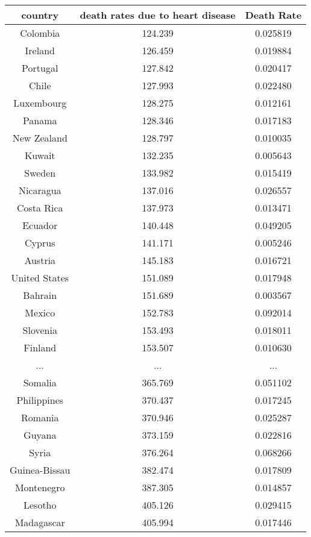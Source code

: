 \documentclass[a4 paper]{article}
\newcommand{\0}{\mathbf{0}}
\begin{document}
\begin{itemize}
\begin{table}[!ht]
\begin{tabular}{|c|c|c|}
        country & death rates due to heart disease & Death Rate\\\hline
        Colombia & 124.239 &    0.025819\\\hline
        Ireland & 126.459 &    0.019884\\\hline
        Portugal & 127.842 &    0.020417\\\hline
        Chile & 127.993 &    0.022480\\\hline
        Luxembourg & 128.275 &    0.012161\\\hline
        Panama & 128.346 &    0.017183\\\hline
        New Zealand & 128.797 &    0.010035\\\hline
        Kuwait & 132.235 &    0.005643\\\hline
        Sweden & 133.982 &    0.015419\\\hline
        Nicaragua & 137.016 &    0.026557\\\hline
        Costa Rica & 137.973 &    0.013471\\\hline
        Ecuador & 140.448 &    0.049205\\\hline
        Cyprus & 141.171 &    0.005246\\\hline
        Austria & 145.183 &    0.016721\\\hline
        United States & 151.089 &    0.017948\\\hline
        Bahrain & 151.689 &    0.003567\\\hline
        Mexico & 152.783 &    0.092014\\\hline
        Slovenia & 153.493 &    0.018011\\\hline
        Finland & 153.507 &    0.010630\\\hline 
        ...&...&...\\\hline
        Somalia & 365.769 & 0.051102\\\hline
        Philippines & 370.437 & 0.017245\\\hline
        Romania & 370.946 & 0.025287\\\hline
        Guyana & 373.159 & 0.022816\\\hline
        Syria & 376.264 & 0.068266\\\hline
        Guinea-Bissau & 382.474 & 0.017809\\\hline
        Montenegro & 387.305 & 0.014857\\\hline
        Lesotho & 405.126 & 0.029415\\\hline
        Madagascar & 405.994 & 0.017446\\\hline

\end{tabular}
\end{table}
\end{itemize}
\end{document}
